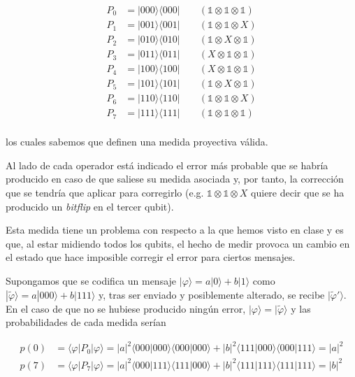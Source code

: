 \documentclass{article}
\begin{document}
\begin{align*}
  P_0 &= |000 \rangle\langle 000| 
  \;\;\;\;\;\;\; 
  (\mathbb{1} \otimes \mathbb{1} \otimes \mathbb{1}) \\
  P_1 &= |001 \rangle\langle 001| 
  \;\;\;\;\;\;\; 
  (\mathbb{1} \otimes \mathbb{1} \otimes X) \\
  P_2 &= |010 \rangle\langle 010| 
  \;\;\;\;\;\;\; 
  (\mathbb{1} \otimes X \otimes \mathbb{1}) \\
  P_3 &= |011 \rangle\langle 011| 
  \;\;\;\;\;\;\;
  (X \otimes \mathbb{1} \otimes \mathbb{1}) \\
  P_4 &= |100 \rangle\langle 100|
  \;\;\;\;\;\;\; 
  (X \otimes \mathbb{1} \otimes \mathbb{1}) \\
  P_5 &= |101 \rangle\langle 101| 
  \;\;\;\;\;\;\; 
  (\mathbb{1} \otimes X \otimes \mathbb{1}) \\
  P_6 &= |110 \rangle\langle 110| 
  \;\;\;\;\;\;\; 
  (\mathbb{1} \otimes \mathbb{1} \otimes X) \\
  P_7 &= |111 \rangle\langle 111| 
  \;\;\;\;\;\;\; 
  (\mathbb{1} \otimes \mathbb{1} \otimes \mathbb{1}) \\
\end{align*}

los cuales sabemos que definen una medida proyectiva válida. 

Al lado de cada operador está indicado el error más probable que se
habría producido en caso de que saliese su medida asociada y, por
tanto, la corrección que se tendría que aplicar para corregirlo
(e.g.  $\mathbb{1} \otimes \mathbb{1} \otimes X$ quiere decir que se
ha producido un \textit{bitflip} en el tercer qubit).

Esta medida tiene un problema con respecto a la que hemos visto en
clase y es que, al estar midiendo todos los qubits, el hecho de
medir provoca un cambio en el estado que hace imposible corregir el
error para ciertos mensajes.

Supongamos que se codifica un mensaje $|\varphi\rangle = a|0\rangle
+ b|1\rangle$ como $|\tilde{\varphi}\rangle = a|000\rangle
+ b|111\rangle$ y, tras ser enviado y posiblemente alterado, se
recibe $|\tilde{\varphi}'\rangle$. En el caso de que no se hubiese
producido ningún error, $|\varphi\rangle = |\tilde{\varphi}\rangle$
y las probabilidades de cada medida serían 

\begin{align*}
  p(0) &= \langle\varphi|P_0|\varphi\rangle 
      = |a|^2\langle 000|000\rangle\langle 000|000\rangle 
      + |b|^2\langle 111|000\rangle\langle 000|111\rangle 
      = |a|^2 \\
  p(7) &= \langle\varphi|P_7|\varphi\rangle 
      = |a|^2\langle 000|111\rangle\langle 111|000\rangle 
      + |b|^2\langle 111|111\rangle\langle 111|111\rangle 
      = |b|^2 \\
\end{align*}
\end{document}
